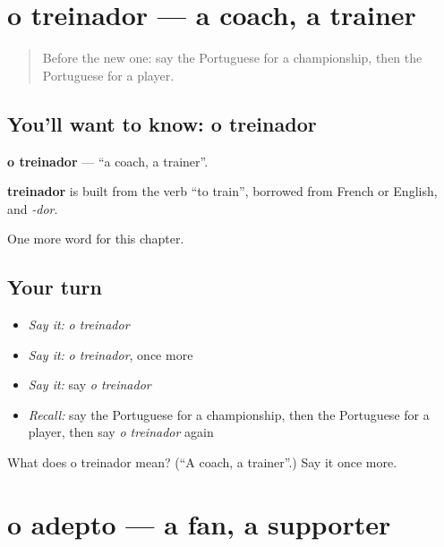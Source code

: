 \section[o treinador]{o treinador — a coach, a trainer}

\label{lesson:PT-C252-treinador}



\begin{quote}
Before the new one: say the Portuguese for a championship, then the Portuguese for a player.
\end{quote}

\subsection*{You'll want to know: o treinador}
\textbf{o treinador} — \textquotedblleft{}a coach, a trainer\textquotedblright{}.

\begin{cousinweb}
\textbf{treinador} is built from the verb \textquotedblleft{}to train\textquotedblright{}, borrowed from French or English, and \emph{-dor}.
\end{cousinweb}

\begin{grammarlens}[title={What you've built}]
One more word for this chapter.
\end{grammarlens}

\subsection*{Your turn}
\begin{itemize}
\raggedright
  \item \emph{Say it:} \emph{o treinador}
  \item \emph{Say it:} \emph{o treinador}, once more
  \item \emph{Say it:} say \emph{o treinador}
  \item \emph{Recall:} say the Portuguese for a championship, then the Portuguese for a player, then say \emph{o treinador} again
\end{itemize}

\begin{tcolorbox}[breakable,colback=teal!4,colframe=teal!35!black,title={Before you move on}]
What does o treinador mean? (\textquotedblleft{}A coach, a trainer\textquotedblright{}.) Say it once more.
\end{tcolorbox}
\section[o adepto]{o adepto — a fan, a supporter}

